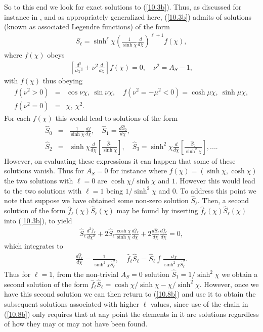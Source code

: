 So to this end we look for exact solutions to (\ref{10.3b}). Thus,  as discussed for instance in \cite{bander_itzykson_1966,mannheim_kazanas_1988}, and as appropriately generalized here,  (\ref{10.3b}) 
admits of solutions (known as associated Legendre functions) of the form 
%
\begin{eqnarray}
S_{\ell}=\sinh^{\ell}\chi\left(\frac{1}{ \sinh\chi} \frac{d }{ d\chi}\right)^{\ell+1}f(\chi),
\label{10.5b}
\end{eqnarray}
%
where $f(\chi)$ obeys
%
\begin{eqnarray}
\left[\frac{d^3}{d\chi^3}+\nu^2\frac{d}{d\chi}\right]f(\chi)=0,\quad \nu^2=A_S-1,
\label{10.6b}
\end{eqnarray}
%
with $f(\chi)$ thus obeying 
%
\begin{eqnarray}
f(\nu^2>0)&=&\cos\nu\chi,~\sin\nu\chi,\quad f(\nu^2=-\mu^2<0)=\cosh\mu\chi,~\sinh\mu\chi,
\nonumber\\
f(\nu^2=0)&=&\chi,~\chi^2.
\label{10.7b}
\end{eqnarray}
%
For each $f(\chi)$ this would lead to solutions of the form
%
\begin{eqnarray}
\hat{S}_0&=&\frac{1}{\sinh\chi}\frac{df}{d\chi},\quad \hat{S}_1=\frac{d\hat{S}_0}{d\chi},
\nonumber\\ \hat{S}_2&=&\sinh\chi\frac{d}{d\chi}\left[\frac{\hat{S}_1}{\sinh\chi}\right],\quad \hat{S}_3=\sinh^2\chi\frac{d}{d\chi}\left[\frac{\hat{S}_2}{\sinh^2\chi}\right],....
\label{10.8b}
\end{eqnarray}
%
However, on evaluating these expressions it can happen that some of these solutions vanish. Thus for $A_S=0$ for instance where $f(\chi)=(\sinh\chi,\cosh\chi)$ the two solutions with $\ell=0$ are $\cosh\chi/\sinh\chi$ and $1$. However this would lead to the two solutions with $\ell=1$ being $1/\sinh^2\chi$ and $0$. To address this point we note that suppose we have obtained some non-zero solution $\hat{S}_{\ell}$. Then, a second solution of the form $\hat{f}_{\ell}(\chi)\hat{S}_{\ell}(\chi)$ may be found by inserting $\hat{f}_{\ell}(\chi)\hat{S}_{\ell}(\chi)$ into (\ref{10.3b}), to yield
%
\begin{eqnarray}
\hat{S}_{\ell}\frac{d^2 \hat{f}_{\ell}}{ d\chi^2}+2\hat{S}_{\ell}\frac{\cosh\chi }{ \sinh\chi}\frac{d \hat{f}_{\ell}}{ d\chi}+2\frac{d \hat{S}_{\ell}}{ d\chi}\frac{d \hat{f}_{\ell}}{ d\chi}=0,
\label{10.9b}
\end{eqnarray}
%
which integrates to
%
\begin{eqnarray}
\frac{d \hat{f}_{\ell}}{ d\chi}=\frac{1}{\sinh^2\chi\hat{S}_{\ell}^2},~~~~~\hat{f}_{\ell}\hat{S}_{\ell}=\hat{S}_{\ell}\int \frac{d\chi }{\sinh^2\chi\hat{S}_{\ell}^2}.
\label{10.10b}
\end{eqnarray}
%
Thus for $\ell=1$, from the non-trivial $A_S=0$ solution $\hat{S}_{1}=1/\sinh^2\chi$ we obtain a second solution of the form $\hat{f}_{\ell}\hat{S}_{\ell}=\cosh\chi/\sinh\chi-\chi/\sinh^2\chi$. However, once we have this second solution we can then return to (\ref{10.8b}) and use it to obtain the subsequent solutions associated with higher $\ell$ values, since use of the chain in (\ref{10.8b}) only requires that at any point the elements in it are solutions regardless of how they may or may not have been found.


